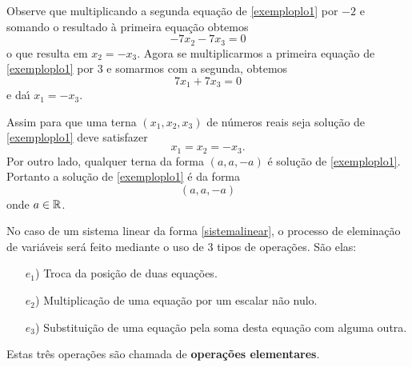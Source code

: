 Observe que multiplicando a segunda equa\c{c}\~ao de \eqref{exemploplo1} por $-2$ e somando o resultado \`a primeira equa\c{c}\~ao obtemos
\[
	-7x_2 - 7x_3 = 0
\]
o que resulta em $x_2 = -x_3$. Agora se multiplicarmos a primeira equa\c{c}\~ao de \eqref{exemploplo1} por $3$ e somarmos com a segunda, obtemos
\[
	7x_1 + 7x_3 = 0
\]
e da{\'\i} $x_1 = -x_3$.

Assim para que uma terna $(x_1, x_2, x_3)$ de n\'umeros reais seja solu\c{c}\~ao de \eqref{exemploplo1} deve satisfazer
\[
	x_1 = x_2 = -x_3.
\]
Por outro lado, qualquer terna da forma $(a, a, -a)$ \'e solu\c{c}\~ao de \eqref{exemploplo1}. Portanto a solu\c{c}\~ao de \eqref{exemploplo1} \'e da forma
\[
	(a, a, -a)
\]
onde $a \in \mathbb{R}$.

No caso de um sistema linear da forma \eqref{sistemalinear}, o processo de elemina\c{c}\~ao de vari\'aveis ser\'a feito mediante o uso de 3 tipos de opera\c{c}\~oes. S\~ao elas:
\begin{itemize}
	\item[$e_1$)] Troca da posi\c{c}\~ao de duas equa\c{c}\~oes.
	\item[$e_2$)] Multiplica\c{c}\~ao de uma equa\c{c}\~ao por um escalar n\~ao nulo.
	\item[$e_3$)] Substitui\c{c}\~ao de uma equa\c{c}\~ao pela soma desta equa\c{c}\~ao com alguma outra.
\end{itemize}

Estas tr\^es opera\c{c}\~oes s\~ao chamada de \textbf{opera\c{c}\~oes elementares}.

